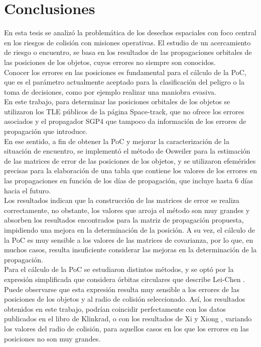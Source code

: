 \chapter{Conclusiones}
\label{chap:conclusiones}

En esta tesis se analiz\'o la problem\'atica de los desechos espaciales con foco central en los riesgos de colisi\'on con misiones operativas. El estudio de un acercamiento de riesgo o encuentro, se basa en los resultados de las propagaciones orbitales de las posiciones de los objetos, cuyos errores no siempre son conocidos.\\

Conocer los errores en las posiciones es fundamental para el c\'alculo de la PoC, que es el par\'ametro actualmente aceptado para la clasificaci\'on del peligro o la toma de decisiones, como por ejemplo realizar una maniobra evasiva.\\ 

En este trabajo, para determinar las posiciones orbitales de los objetos se utilizaron los TLE p\'ublicos de la p\'agina Space-track, que no ofrece los errores asociados y el propagador SGP4 \citep{sgp4python} que tampoco da informaci\'on de los errores de propagaci\'on que introduce.\\

En ese sentido, a fin de obtener la PoC y mejorar la caracterizaci\'on de la situaci\'on de encuentro, se implement\'o el m\'etodo de Osweiler \citep{osweiler} para la estimaci\'on de las matrices de error de las posiciones de los objetos, y se utilizaron efem\'erides precisas para la elaboraci\'on de una tabla que contiene los valores de los errores en las propagaciones en funci\'on de los d\'ias de propagaci\'on, que incluye hasta 6 d\'ias hacia el futuro.\\

Los resultados indican que la construcci\'on de las matrices de error se realiza correctamente, no obstante, los valores que arroja el m\'etodo son muy grandes y absorben los resultados encontrados para la matriz de propagaci\'on propuesta, impidiendo una mejora en la determinaci\'on de la posici\'on.  A su vez, el c\'alculo de la PoC es muy sensible a los valores de las matrices de covarianza, por lo que, en muchos casos, resulta insuficiente considerar las mejoras en la determinaci\'on de la propagaci\'on.\\

Para el c\'alculo de la PoC se estudiaron distintos m\'etodos, y se opt\'o por la expresi\'on simplificada que considera \'orbitas circulares que describe Lei-Chen \citep{leichen}. Puede observarse que esta expresi\'on resulta muy sensible a los errores de las posiciones de los objetos y al radio de colisi\'on seleccionado. As\'i, los resultados obtenidos en este trabajo, podr\'ian coincidir perfectamente con los datos publicados en el libro de  Klinkrad, \citep{Klinkrad} o con los resultados de Xi y Xiong \citep{xu2014method}, variando los valores del radio de colisi\'on, para aquellos casos en los que los errores en las posiciones no son muy grandes.\\

